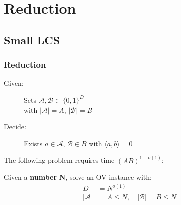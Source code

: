 

\section{Reduction}
\subsection{Small LCS}


\begin{frame}[t]
	\frametitle{Reduction}
	
	\begin{definition}
		\begin{description}
			\item[Given:] Sets $\mathcal{A}, \mathcal{B} \subset \{0,1\}^D$ \\
				with $|\mathcal{A}| = A$, $|\mathcal{B}| = B$ 
			
			\item[Decide:] Exists $a \in \mathcal{A}$, $\mathcal{B} \in B$ with $\langle a,b\rangle = 0$
		\end{description}				
	\end{definition}
	
	\begin{definition}
		The following problem requires time $(AB)^{1-o(1)}$:
		
		Given a \textbf{number} $\mathbf{N}$, solve an OV instance with:	
\begin{align*} 
	D &= N^{o(1)} \\ 
	|\mathcal{A}| &= A \leq N,\quad |\mathcal{B}| = B \leq N
\end{align*}
  	\end{definition}
  	

\end{frame}


